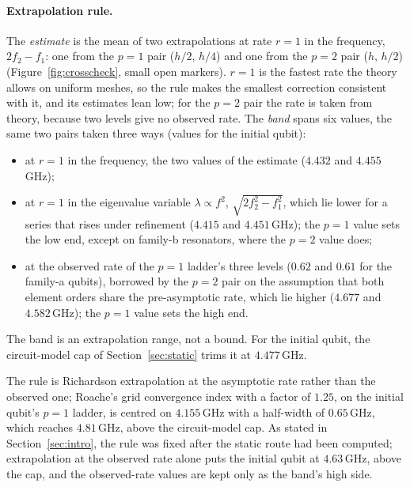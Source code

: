 \documentclass{anvil-paper}
\begin{document}
\paragraph{Extrapolation rule.}
The \emph{estimate} is the mean of two extrapolations at rate $r = 1$ in the
frequency, $2f_2 - f_1$: one from the $p = 1$ pair ($h/2$, $h/4$) and one
from the $p = 2$ pair ($h$, $h/2$) (Figure~\ref{fig:crosscheck}, small open
markers). $r = 1$ is the fastest rate the theory
allows on uniform meshes, so the rule makes the smallest correction
consistent with it, and its estimates lean low; for the $p = 2$ pair the
rate is taken from theory, because two levels give no observed rate. The
\emph{band} spans six values, the same two pairs taken three ways (values
for the initial qubit):
\begin{itemize}\setlength{\itemsep}{0pt}
  \item at $r = 1$ in the frequency, the two values of the estimate
    ($4.432$ and $4.455$\,GHz);
  \item at $r = 1$ in the eigenvalue variable $\lambda\propto f^2$,
    $\sqrt{2f_2^2 - f_1^2}$, which lie lower for a series that rises
    under refinement ($4.415$ and $4.451$\,GHz); the $p = 1$ value sets
    the low end, except on family-b resonators, where the $p = 2$ value
    does;
  \item at the observed rate of the $p = 1$ ladder's three levels
    ($0.62$ and $0.61$ for the family-a qubits), borrowed by the $p = 2$
    pair on the assumption that both element orders share the
    pre-asymptotic rate, which lie higher ($4.677$ and $4.582$\,GHz); the
    $p = 1$ value sets the high end.
\end{itemize}
The band is an extrapolation range, not a bound. For the initial qubit,
the circuit-model cap of Section~\ref{sec:static} trims it at
$4.477$\,GHz.

The rule is Richardson extrapolation \citep{richardson1911approximate} at
the asymptotic rate rather than the observed one; Roache's grid
convergence index \citep{roache1994perspective} with a factor of $1.25$,
on the initial qubit's $p = 1$ ladder, is centred on
$4.155$\,GHz with a half-width of $0.65$\,GHz, which reaches $4.81$\,GHz,
above the circuit-model cap. As stated in Section~\ref{sec:intro}, the
rule was fixed after the static route had
been computed; extrapolation at the observed rate alone puts the initial
qubit at $4.63$\,GHz, above the cap, and the observed-rate values are kept
only as the band's high side.
\end{document}
